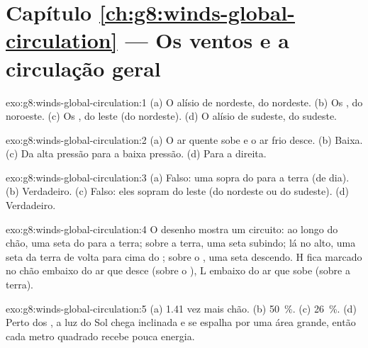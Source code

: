 \section*{Capítulo \ref{ch:g8:winds-global-circulation} --- Os ventos e a circulação geral}

\begin{solution}{exo:g8:winds-global-circulation:1}
(a) O alísio de nordeste, do nordeste. (b) Os , do
noroeste. (c) Os , do leste (do nordeste). (d) O
alísio de sudeste, do sudeste.
\end{solution}

\begin{solution}{exo:g8:winds-global-circulation:2}
(a) O ar quente sobe e o ar frio desce. (b) Baixa. (c) Da alta pressão
para a baixa pressão. (d) Para a direita.
\end{solution}

\begin{solution}{exo:g8:winds-global-circulation:3}
(a) Falso: uma  sopra do  para a terra (de dia).
(b) Verdadeiro. (c) Falso: eles sopram do leste (do nordeste ou do
sudeste). (d) Verdadeiro.
\end{solution}

\begin{solution}{exo:g8:winds-global-circulation:4}
O desenho mostra um circuito: ao longo do chão, uma seta do  para a
terra; sobre a terra, uma seta subindo; lá no alto, uma seta da terra de
volta para cima do ; sobre o , uma seta descendo. H fica marcado no
chão embaixo do ar que desce (sobre o ), L embaixo do ar que sobe
(sobre a terra).
\end{solution}

\begin{solution}{exo:g8:winds-global-circulation:5}
(a) 1.41 vez mais chão. (b) 50~\%. (c) 26~\%. (d) Perto dos , a luz
do Sol chega inclinada e se espalha por uma área grande, então cada metro
quadrado recebe pouca energia.
\end{solution}

